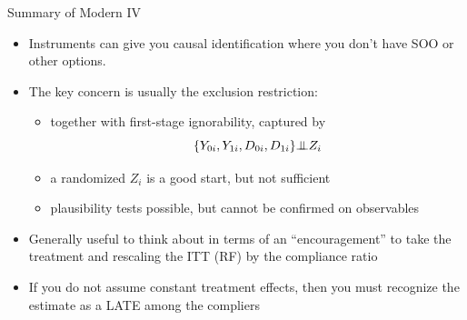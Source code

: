 \documentclass[xcolor=dvipsnames]{beamer}
\newcommand{\indep}{{\bot\negthickspace\negthickspace\bot}}
\begin{document}
\begin{frame}{Summary of Modern IV}
\begin{itemize}
\small
\item Instruments can give you causal identification where you don't have SOO or other options. 
\smallskip
\item The key concern is usually the exclusion restriction:
\footnotesize
\begin{itemize}
\item together with first-stage ignorability, captured by $$ \{ Y_{0i},Y_{1i}, D_{0i},D_{1i} \} \indep Z_i $$
\item a randomized $Z_i$ is a good start, but not sufficient
\item plausibility tests possible, but cannot be confirmed on observables
\end{itemize}
\small
\item Generally useful to think about in terms of an ``encouragement'' to take the treatment and rescaling the ITT (RF) by the compliance ratio
\smallskip
\item If you do not assume constant treatment effects, then you must recognize the estimate as a LATE among the compliers
\end{itemize}
\end{frame}


%
\end{document}

